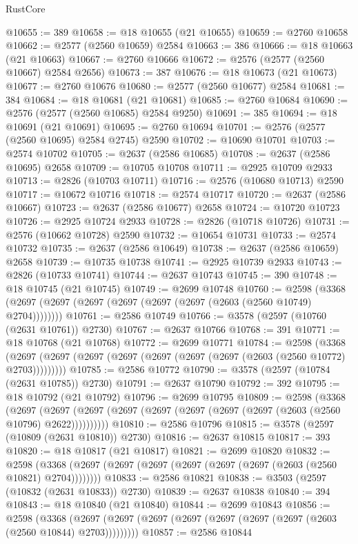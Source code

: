 \begin{lexlean}{RustCore}
\begin{coremodule}
@10655 := 389
@10658 := @18 @10655 (@21 @10655)
@10659 := @2760 @10658
@10662 := @2577 (@2560 @10659) @2584
@10663 := 386
@10666 := @18 @10663 (@21 @10663)
@10667 := @2760 @10666
@10672 := @2576 (@2577 (@2560 @10667) @2584 @2656)
@10673 := 387
@10676 := @18 @10673 (@21 @10673)
@10677 := @2760 @10676
@10680 := @2577 (@2560 @10677) @2584
@10681 := 384
@10684 := @18 @10681 (@21 @10681)
@10685 := @2760 @10684
@10690 := @2576 (@2577 (@2560 @10685) @2584 @9250)
@10691 := 385
@10694 := @18 @10691 (@21 @10691)
@10695 := @2760 @10694
@10701 := @2576 (@2577 (@2560 @10695) @2584 @2745) @2590
@10702 := @10690 @10701
@10703 := @2574 @10702
@10705 := @2637 (@2586 @10685)
@10708 := @2637 (@2586 @10695) @2658
@10709 := @10705 @10708
@10711 := @2925 @10709 @2933
@10713 := @2826 (@10703 @10711)
@10716 := @2576 (@10680 @10713) @2590
@10717 := @10672 @10716
@10718 := @2574 @10717
@10720 := @2637 (@2586 @10667)
@10723 := @2637 (@2586 @10677) @2658
@10724 := @10720 @10723
@10726 := @2925 @10724 @2933
@10728 := @2826 (@10718 @10726)
@10731 := @2576 (@10662 @10728) @2590
@10732 := @10654 @10731
@10733 := @2574 @10732
@10735 := @2637 (@2586 @10649)
@10738 := @2637 (@2586 @10659) @2658
@10739 := @10735 @10738
@10741 := @2925 @10739 @2933
@10743 := @2826 (@10733 @10741)
@10744 := @2637 @10743
@10745 := 390
@10748 := @18 @10745 (@21 @10745)
@10749 := @2699 @10748
@10760 := @2598 (@3368 (@2697 (@2697 (@2697 (@2697 (@2697 (@2697 (@2603 (@2560 @10749) @2704))))))))
@10761 := @2586 @10749
@10766 := @3578 (@2597 (@10760 (@2631 @10761)) @2730)
@10767 := @2637 @10766
@10768 := 391
@10771 := @18 @10768 (@21 @10768)
@10772 := @2699 @10771
@10784 := @2598
    (@3368 (@2697 (@2697 (@2697 (@2697 (@2697 (@2697 (@2697 (@2603 (@2560 @10772) @2703)))))))))
@10785 := @2586 @10772
@10790 := @3578 (@2597 (@10784 (@2631 @10785)) @2730)
@10791 := @2637 @10790
@10792 := 392
@10795 := @18 @10792 (@21 @10792)
@10796 := @2699 @10795
@10809 := @2598
    (@3368
      (@2697 (@2697 (@2697 (@2697 (@2697 (@2697 (@2697 (@2697 (@2603 (@2560 @10796) @2622))))))))))
@10810 := @2586 @10796
@10815 := @3578 (@2597 (@10809 (@2631 @10810)) @2730)
@10816 := @2637 @10815
@10817 := 393
@10820 := @18 @10817 (@21 @10817)
@10821 := @2699 @10820
@10832 := @2598 (@3368 (@2697 (@2697 (@2697 (@2697 (@2697 (@2697 (@2603 (@2560 @10821) @2704))))))))
@10833 := @2586 @10821
@10838 := @3503 (@2597 (@10832 (@2631 @10833)) @2730)
@10839 := @2637 @10838
@10840 := 394
@10843 := @18 @10840 (@21 @10840)
@10844 := @2699 @10843
@10856 := @2598
    (@3368 (@2697 (@2697 (@2697 (@2697 (@2697 (@2697 (@2697 (@2603 (@2560 @10844) @2703)))))))))
@10857 := @2586 @10844

\end{coremodule}
\end{lexlean}
